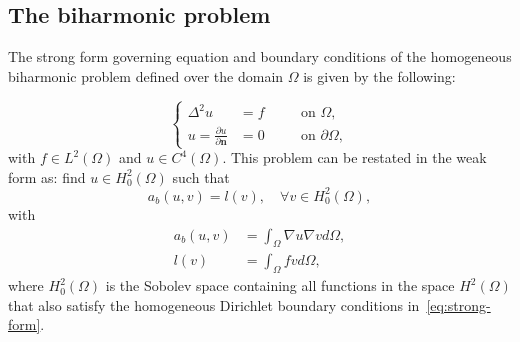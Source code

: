 \subsection{The biharmonic problem}

The strong form governing equation and boundary conditions of the homogeneous biharmonic problem defined over the domain $\Omega$ is given by the following:

\begin{equation}\label{eq:strong-form}
  \left\{\begin{alignedat}{2}
    \Delta^2u&=f\quad &&\text{on }\Omega,\\
    u=\frac{\partial{u}}{\partial{\mathbf{n}}}&=0\quad &&\text{on }\partial\Omega,
  \end{alignedat}\right.
\end{equation}
with $f\in{}L^2(\Omega)$ and $u\in{}C^4(\Omega)$. This problem can be restated in the weak form as: find $u\in{}H^2_0(\Omega)$ such that
\begin{equation}\label{eq:weak-form}
  a_b(u,v)=l(v),\quad\forall{}v\in{}H^2_0(\Omega),
\end{equation}
with
\begin{equation}
  \begin{split}
    a_b(u,v)&=\int_{\Omega}\nabla u \nabla v d \Omega,\\
    l(v) &= \int_{\Omega} fv d \Omega,
  \end{split}
\end{equation}
where $H^2_0(\Omega)$ is the Sobolev space containing all functions in the space $H^2(\Omega)$ that also satisfy the homogeneous Dirichlet boundary conditions in~\eqref{eq:strong-form}.

